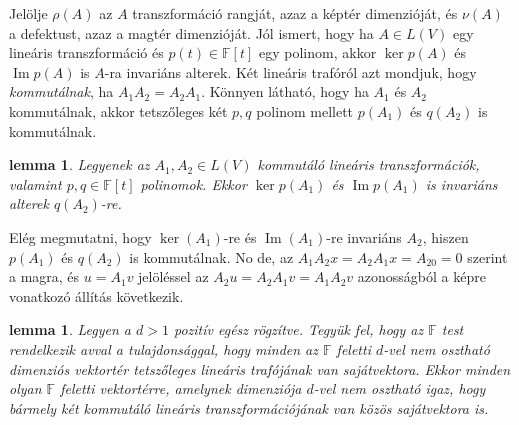 \documentclass[9pt, a4paper, showtrims]{memoir}
\makeatletter
\renewenvironment{proof}[1][\proofname]
    {\par\pushQED{\qed}%
    \normalfont \topsep6\p@\@plus6\p@\relax
    \trivlist
    \item[\hskip\labelsep
        \itshape
    #1\@addpunct{:}]\ignorespaces}
    {\popQED\endtrivlist\@endpefalse}
\theoremstyle{plain}
\newtheorem{lemma}[proposition]{lemma}
\theoremstyle{remark}
\theoremstyle{definition}
\DeclareMathOperator{\im}{Im}
\makeatother
\begin{document}
Jelölje $\rho\left( A \right)$ az $A$ transzformáció rangját, 
azaz a képtér dimenzióját,
és $\nu\left( A \right)$ a defektust, azaz a magtér dimenzióját.
Jól ismert, hogy ha $A\in L\left( V \right)$ egy lineáris transzformáció
és $p\left( t \right)\in\mathbb{F}\left[ t \right]$ egy polinom, akkor 
$\ker p\left( A \right)$ és
$\im p\left( A \right)$ is $A$-ra invariáns alterek.
Két lineáris trafóról azt mondjuk, hogy \emph{kommutálnak},
ha $A_1A_2=A_2A_1.$
Könnyen látható, hogy ha $A_1$ és $A_2$ kommutálnak, akkor tetszőleges két $p,q$
polinom mellett $p\left( A_1 \right)$ és $q\left( A_2 \right)$ is kommutálnak.
\begin{lemma}
    Legyenek az $A_1,A_2\in L\left( V \right)$ kommutáló lineáris transzformációk,
    valamint $p,q\in\mathbb{F}\left[ t \right]$ polinomok.
    Ekkor $\ker p\left( A_1 \right)$ és
    $\im p\left( A_1 \right)$ is invariáns alterek $q\left( A_2 \right)$-re.
\end{lemma}
\begin{proof}
    Elég megmutatni, hogy $\ker\left( A_1 \right)$-re és
    $\im\left( A_1 \right)$-re invariáns $A_2$, hiszen $p\left( A_1 \right)$ 
    és $q\left( A_2 \right)$ is kommutálnak.
    No de, az
    \(
    A_1 A_2 x=A_2A_1x=A_20=0
    \)
    szerint a magra,
    és $u=A_1v$ jelöléssel az
    \(
    A_2u=A_2 A_1v =A_1A_2v 
    \)
    azonosságból a képre vonatkozó állítás következik.
\end{proof}
\begin{lemma}
    \label{le:indukcio}
    Legyen a $d>1$ pozitív egész rögzítve. 
    Tegyük fel, hogy az $\mathbb{F}$ test rendelkezik avval a tulajdonsággal,
    hogy minden az $\mathbb{F}$ feletti $d$-vel nem osztható dimenziós vektortér tetszőleges
    lineáris trafójának van sajátvektora.
    Ekkor minden olyan $\mathbb{F}$ feletti vektortérre, 
    amelynek dimenziója $d$-vel nem osztható igaz, 
    hogy bármely két kommutáló lineáris transzformációjának van közös sajátvektora is.
\end{lemma}
\end{document}
